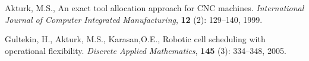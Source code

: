 \newpage
\pagestyle{plain}


\begin{thebibliography}{99}

 Akturk, M.S., An exact tool allocation approach for CNC machines. {\em International Journal of Computer Integrated Manufacturing}, {\bf 12} (2): 129--140, 1999.

 Gultekin, H., Akturk, M.S., Karasan,O.E., Robotic cell scheduling with operational flexibility. {\em Discrete Applied Mathematics}, {\bf 145} (3): 334--348, 2005.

\end{thebibliography}